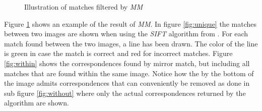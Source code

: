 \documentclass[12pt,journal,compsoc]{IEEEtran}
\begin{document}
\begin{figure}
	\caption{Illustration of matches filtered by \emph{MM}}
	\label{fig:comparemirror}
\end{figure}
%
Figure \ref{fig:comparemirror} shows an example of the result of 
\emph{MM}. In figure \ref{fig:unique} the matches between two images are 
shown when using the \emph{SIFT} algorithm from \cite{lowe2004sift}. For 
each match found between the two images, a line has been drawn. The 
color of the line is green in case the match is correct and red for 
incorrect matches. Figure \ref{fig:within} shows the correspondences 
found by mirror match, but including all matches that are found within 
the same image. Notice how the by the bottom of the image admits 
correspondences that can conveniently be removed as done in sub figure 
\ref{fig:without} where only the actual correspondences returned by the 
algorithm are shown.
%
\end{document}
